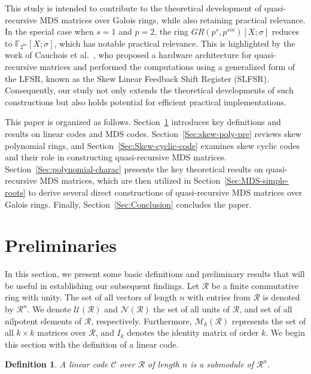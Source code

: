 \documentclass[11pt]{article}
\newtheorem{definition}{Definition}
\begin{document}
This study is intended to contribute to the theoretical development of quasi-recursive MDS matrices over Galois rings, while also retaining practical relevance. In the special case when $s = 1$ and $p = 2$, the ring $GR(p^s, p^{sm})[X; \sigma]$ reduces to $\mathbb{F}_{2^{m}}[X; \sigma]$, which has notable practical relevance. This is highlighted by the work of Cauchois et al.~\cite{Cauchois2016direct}, who proposed a hardware architecture for quasi-recursive matrices and performed the computations using a generalized form of the LFSR, known as the Skew Linear Feedback Shift Register (SLFSR). Consequently, our study not only extends the theoretical developments of such constructions but also holds potential for efficient practical implementations.

\vspace{1em}


\noindent This paper is organized as follows. Section~\ref{Sec:Pre} introduces key definitions and results on linear codes and MDS codes. Section~\ref{Sec:skew-poly-pre} reviews skew polynomial rings, and Section~\ref{Sec:Skew-cyclic-code} examines skew cyclic codes and their role in constructing quasi-recursive MDS matrices. Section~\ref{Sec:polynomial-charac} presents the key theoretical results on quasi-recursive MDS matrices, which are then utilized in Section~\ref{Sec:MDS-simple-roots} to derive several direct constructions of quasi-recursive MDS matrices over Galois rings. Finally, Section~\ref{Sec:Conclusion} concludes the paper.






\section{Preliminaries}\label{Sec:Pre}
In this section, we present some basic definitions and preliminary results that will be useful in establishing our subsequent findings. Let $\mathcal{R}$ be a finite commutative ring with unity. The set of all vectors of length $n$ with entries from $\mathcal{R}$ is denoted by $\mathcal{R}^n$. We denote  $\mathcal{U}(\mathcal{R})$ and $\mathcal{N}(\mathcal{R})$ the set of all units  of $\mathcal{R}$, and set of all nilpotent elements of $\mathcal{R}$, respectively. Furthermore, $\mathcal{M}_k(\mathcal{R})$ represents the set of all $k \times k$ matrices over $\mathcal{R}$, and $I_k$ denotes the identity matrix of order $k$. We begin this section with the definition of a linear code.

  \begin{definition}
  
A linear code $\mathcal{C}$ over $\mathcal{R}$ of length $n$ is a submodule of $\mathcal{R}^n$.

\end{definition}
\end{document}
